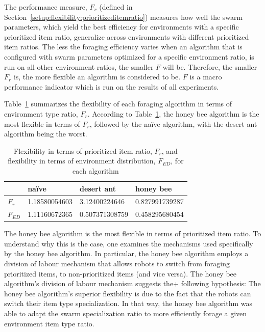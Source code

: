 The performance measure, $F_r$ (defined in Section~\ref{setup:flexibility:prioritizeditemratio}) measures how well the swarm parameters, which yield the best efficiency for environments with a specific prioritized item ratio, generalize across environments with different prioritized item ratios. The less the foraging efficiency varies when an algorithm that is configured with swarm parameters optimized for a specific environment ratio, is run on all other environment ratios, the smaller $F$ will be. Therefore, the smaller $F_r$ is, the more flexible an algorithm is considered to be. $F$ is a macro performance indicator which is run on the results of all experiments. 

Table~\ref{table:flexibility} summarizes the flexibility of each foraging algorithm in terms of environment type ratio, $F_r$. According to Table~\ref{table:flexibility}, the honey bee algorithm is the most flexible in terms of $F_r$, followed by the na\"ive algorithm, with the desert ant algorithm being the worst. 

 
\begin{table}[]
\centering
\caption{Flexibility in terms of prioritized item ratio, $F_r$, and flexibility in terms of environment distribution, $F_{ED}$, for each algorithm}
\label{table:flexibility}
\begin{tabular}{@{}llll@{}}
\toprule
\textbf{}         & na\"ive         & desert ant        & honey bee         \\ \midrule
\textbf{$F_r$}    & 1.18580054603 & 3.12400224646     & 0.827991739287    \\ \midrule
\textbf{$F_{ED}$} & 1.11160672365 & 0.507371308759 & 0.458295680454 
\end{tabular}
\end{table}

The honey bee algorithm is the most flexible in terms of prioritized item ratio. To understand why this is the case, one examines the mechanisms used specifically by the honey bee algorithm. In particular, the honey bee algorithm employs a division of labour mechanism that allows robots to switch from foraging prioritized items, to non-prioritized items (and vice versa). The honey bee algorithm's division of labour mechanism suggests the+ following hypothesis: The honey bee algorithm's superior flexibility is due to the fact that the robots can switch their item type specialization. In that way, the honey bee algorithm was able to adapt the swarm specialization ratio to more efficiently forage a given environment item type ratio.

